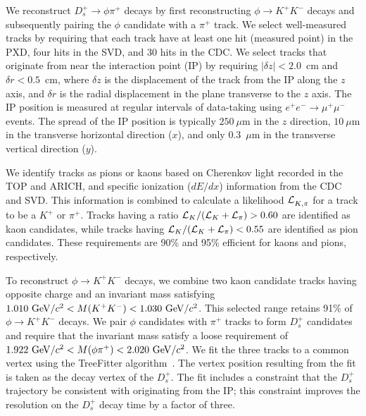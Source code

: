 \documentclass[aps,prl,twocolumn,superscriptaddress,showpacs,preprintnumbers,amsmath,amssymb]{revtex4-2}
\def\ra{\!\rightarrow\!}
\def\Dsphipi{D^+_s\ra\phi\pi^+}
\def\phikk{\phi\ra K^+K^-}
\begin{document}
We reconstruct $\Dsphipi$ decays by first reconstructing $\phi\ra K^+K^-$ 
decays and subsequently pairing the $\phi$ candidate with a $\pi^+$ track. We 
select well-measured tracks by requiring that each track have at least one hit 
(measured point) in the PXD, four hits in the SVD, and 30 hits in the CDC.
We select tracks that originate from near the interaction point (IP) by 
requiring $|\delta z|< 2.0$~cm and $\delta r< 0.5$~cm, where 
$\delta z$ is the displacement of the track from the IP
along the $z$ axis, %
and $\delta r$ is the radial displacement in the plane transverse 
to the $z$ axis. The IP position is measured at regular intervals 
of data-taking using $e^+e^-\ra\mu^+\mu^-$ events. The spread of
the IP position is typically $250~\mu$m in the $z$ direction, 
$10~\mu$m in the transverse horizontal direction ($x$), and 
only $0.3$~$\mu$m in the transverse vertical direction ($y$). 

We identify tracks as pions or kaons based 
on Cherenkov light recorded in the TOP
and ARICH, and specific ionization ($dE/dx$)
information from the CDC and SVD. This information is combined 
to calculate a likelihood ${\cal L}^{}_{K,\pi}$ 
for a track to be a $K^+$ or $\pi^+$. Tracks having a ratio 
${\cal L}_{K}/({\cal L}_{K}+{\cal L}_{\pi})>0.60$ 
are identified as kaon candidates, while tracks having
${\cal L}_{K}/({\cal L}_{K}+{\cal L}_{\pi})<0.55$ 
are identified as pion candidates. These requirements 
are 90\% and 95\% efficient for kaons and pions, respectively.

To reconstruct $\phikk$ decays, we combine two kaon candidate 
tracks having opposite charge and an invariant mass satisfying 
$1.010~{\rm GeV}/c^2 < M(K^+K^-) < 1.030~{\rm GeV}/c^2$. 
This selected range retains 91\% of $\phi\ra K^+K^-$ decays.
We pair $\phi$ candidates with $\pi^+$ tracks to form $D_s^+$
candidates and require that the invariant mass satisfy a loose 
requirement of $1.922~{\rm GeV}/c^2 < M(\phi\pi^+) <2.020~{\rm GeV}/c^2$.
We fit the three tracks to a common vertex using the 
{\sc TreeFitter} algorithm~\cite{Belle-IIanalysissoftwareGroup:2019dlq}. 
The vertex position resulting from the fit is taken as the decay vertex 
of the $D_s^+$. The fit includes a constraint that the $D_s^+$ trajectory 
be consistent with originating from the IP; this constraint improves the 
resolution on the $D_s^+$ decay time by a factor of three.
\end{document}
